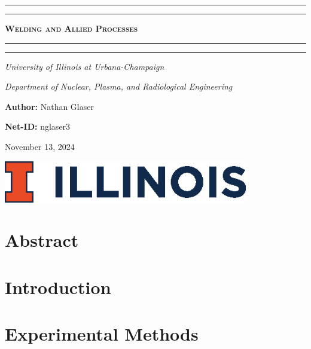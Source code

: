 \documentclass{article}
\begin{document}
\newcommand{\Fig}[3]{\begin{figure}[!h!]\centering\texttt{[image: \#1]}\caption{#2}\label{#3}\end{figure}}
\begin{titlepage}

\centering
\scshape


%
\rule{\textwidth}{1.6pt}\vspace*{-\baselineskip}\vspace*{2pt}
\rule{\textwidth}{0.4pt}

{\Huge \textbf{\textsc{ Welding and Allied Processes \\
\vspace{15pt}}}}

\rule{\textwidth}{0.4pt}\vspace*{-\baselineskip}\vspace{3pt}
\rule{\textwidth}{1.6pt}\vspace{6pt}
\centerline{\textit{University of Illinois at Urbana-Champaign}} 
\centerline{\textit{Department of Nuclear, Plasma, and Radiological Engineering}}
\vspace{1.5\baselineskip}


\large \centerline{\textbf{Author:} Nathan Glaser}
\large \centerline{\textbf{Net-ID:} nglaser3}
\quad
\large \centerline{November 13, 2024}

\vfill{}
\includegraphics[width=0.8\textwidth]{./illinois.eps}\\[1cm]
%
\end{titlepage}

\tableofcontents
\newpage
{}

\section{Abstract}

\section{Introduction}

\section{Experimental Methods}
\end{document}
